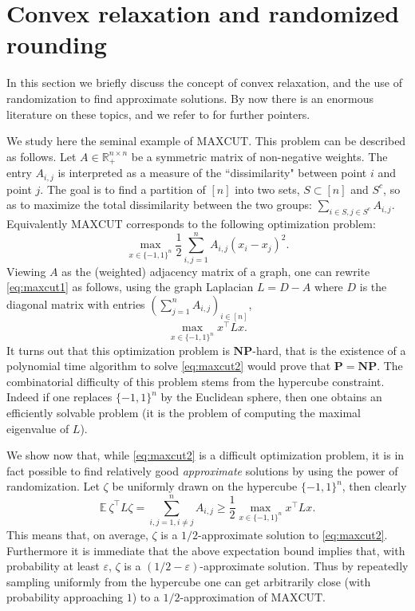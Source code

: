 \documentclass[openany]{now}
\newcommand{\E}{\mathbb{E}}
\newcommand{\R}{\mathbb{R}}
\renewcommand{\epsilon}{\varepsilon}
\begin{document}
\section{Convex relaxation and randomized rounding} \label{sec:convexrelaxation}
In this section we briefly discuss the concept of convex relaxation, and the use of randomization to find approximate solutions. By now there is an enormous literature on these topics, and we refer to \cite{Bar14} for further pointers. 

We study here the seminal example of $\mathrm{MAXCUT}$. This problem can be described as follows. Let $A \in \R_+^{n \times n}$ be a symmetric matrix of non-negative weights. The entry $A_{i,j}$ is interpreted as a measure of the ``dissimilarity" between point $i$ and point $j$. The goal is to find a partition of $[n]$ into two sets, $S \subset [n]$ and $S^c$, so as to maximize the total dissimilarity between the two groups: $\sum_{i \in S, j \in S^c} A_{i,j}$. Equivalently $\mathrm{MAXCUT}$ corresponds to the following optimization problem:
\begin{equation} \label{eq:maxcut1}
\max_{x \in \{-1,1\}^n} \frac12 \sum_{i,j =1}^n A_{i,j} (x_i - x_j)^2 .
\end{equation}
Viewing $A$ as the (weighted) adjacency matrix of a graph, one can rewrite \eqref{eq:maxcut1} as follows, using the graph Laplacian $L=D-A$ where $D$ is the diagonal matrix with entries $(\sum_{j=1}^n A_{i,j})_{i \in [n]}$,
\begin{equation} \label{eq:maxcut2}
\max_{x \in \{-1,1\}^n} x^{\top} L x .
\end{equation}
It turns out that this optimization problem is $\mathbf{NP}$-hard, that is the existence of a polynomial time algorithm to solve \eqref{eq:maxcut2} would prove that $\mathbf{P} = \mathbf{NP}$. The combinatorial difficulty of this problem stems from the hypercube constraint. Indeed if one replaces $\{-1,1\}^n$ by the Euclidean sphere, then one obtains an efficiently solvable problem (it is the problem of computing the maximal eigenvalue of $L$).

We show now that, while \eqref{eq:maxcut2} is a difficult optimization problem, it is in fact possible to find relatively good {\em approximate} solutions by using the power of randomization. 
Let $\zeta$ be uniformly drawn on the hypercube $\{-1,1\}^n$, then clearly
$$\E \ \zeta^{\top} L \zeta = \sum_{i,j=1, i \neq j}^n A_{i,j} \geq \frac{1}{2} \max_{x \in \{-1,1\}^n} x^{\top} L x .$$
This means that, on average, $\zeta$ is a $1/2$-approximate solution to \eqref{eq:maxcut2}. Furthermore it is immediate that the above expectation bound implies that, with probability at least $\epsilon$, $\zeta$ is a $(1/2-\epsilon)$-approximate solution. Thus by repeatedly sampling uniformly from the hypercube one can get arbitrarily close (with probability approaching $1$) to a $1/2$-approximation of $\mathrm{MAXCUT}$.
\end{document}
